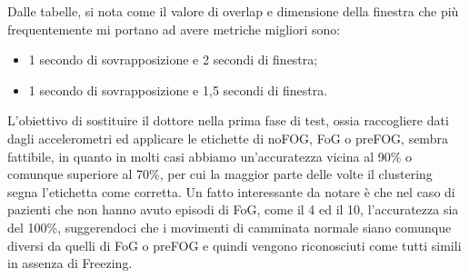 Dalle tabelle, si nota come il valore di overlap e dimensione della finestra che più frequentemente mi portano ad avere metriche migliori sono:
\begin{itemize}
	\item 1 secondo di sovrapposizione e 2 secondi di finestra;
	\item 1 secondo di sovrapposizione e 1,5 secondi di finestra.
\end{itemize}
L'obiettivo di sostituire il dottore nella prima fase di test, ossia raccogliere dati dagli accelerometri ed applicare le etichette di noFOG, FoG o preFOG, sembra fattibile, in quanto in molti casi abbiamo un'accuratezza vicina al 90\% o comunque superiore al 70\%, per cui la maggior parte delle volte il clustering segna l'etichetta come corretta. Un fatto interessante da notare è che nel caso di pazienti che non hanno avuto episodi di FoG, come il 4 ed il 10, l'accuratezza sia del 100\%, suggerendoci che i movimenti di camminata normale siano comunque diversi da quelli di FoG o preFOG e quindi vengono riconosciuti come tutti simili in assenza di Freezing.\\
